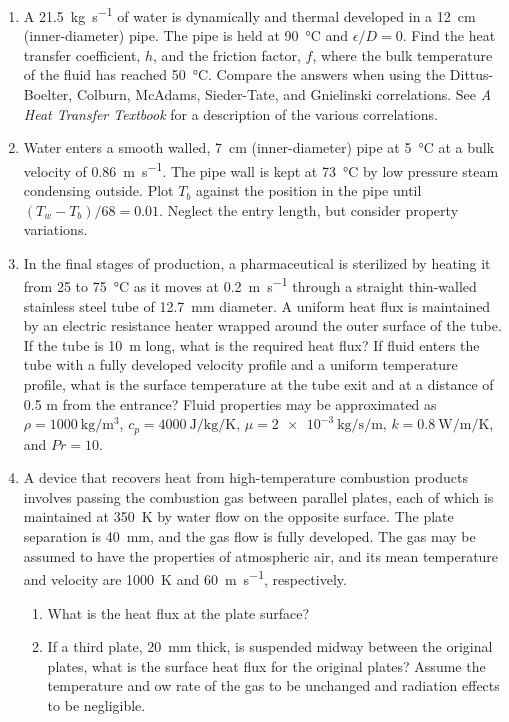 \documentclass[12pt,letterpaper]{article}
\begin{document}
\begin{enumerate}
    \item A \SI{21.5}{\kilogram\per\second} of water is dynamically and thermal developed in a \SI{12}{\centi\meter} (inner-diameter) pipe.
        The pipe is held at \SI{90}{\celsius} and $\epsilon / D = 0$.
        Find the heat transfer coefficient, $h$, and the friction factor, $f$, where the bulk temperature of the fluid has reached \SI{50}{\celsius}.
        Compare the answers when using the Dittus-Boelter, Colburn, McAdams, Sieder-Tate, and Gnielinski correlations.
        See \textit{A Heat Transfer Textbook} for a description of the various correlations.
    
    \item Water enters a smooth walled, \SI{7}{\centi\meter} (inner-diameter) pipe at \SI{5}{\celsius} at a bulk velocity of \SI{0.86}{\meter\per\second}.
        The pipe wall is kept at \SI{73}{\celsius} by low pressure steam condensing outside.
        Plot $T_b$ against the position in the pipe until $\left( T_w - T_b \right) / 68 = 0.01$.
        Neglect the entry length, but consider property variations.
    
    \item In the final stages of production, a pharmaceutical is sterilized by heating it from 25 to \SI{75}{\celsius} as it moves at \SI{0.2}{\meter\per\second} through a straight thin-walled stainless steel tube of \SI{12.7}{\milli\meter} diameter.
        A uniform heat flux is maintained by an electric resistance heater wrapped around the outer surface of the tube.
        If the tube is \SI{10}{\meter} long, what is the required heat flux?
        If fluid enters the tube with a fully developed velocity profile and a uniform temperature profile, what is the surface temperature at the tube exit and at a distance of 0.5 m from the entrance?
        Fluid properties may be approximated as $\rho = \SI{1000}{\kilogram\per\cubic\meter}$, $c_p = \SI{4000}{\joule\per\kilogram\per\kelvin}$, $\mu = \SI{2e-3}{\kilogram\per\second\per\meter}$, $k = \SI{0.8}{\watt\per\meter\per\kelvin}$, and $\mathit{Pr} = 10$.
    
    \item A device that recovers heat from high-temperature combustion products involves passing the combustion gas between parallel plates, each of which is maintained at \SI{350}{\kelvin} by water flow on the opposite surface.
        The plate separation is \SI{40}{\milli\meter}, and the gas flow is fully developed.
        The gas may be assumed to have the properties of atmospheric air, and its mean temperature and velocity are \SI{1000}{\kelvin} and \SI{60}{\meter\per\second}, respectively.
        \begin{enumerate}
            \item What is the heat flux at the plate surface?
            \item If a third plate, \SI{20}{\milli\meter} thick, is suspended midway between the original plates, what is the surface heat flux for the original plates?
                Assume the temperature and ow rate of the gas to be unchanged and radiation effects to be negligible.
        \end{enumerate}
\end{enumerate}
\end{document}
